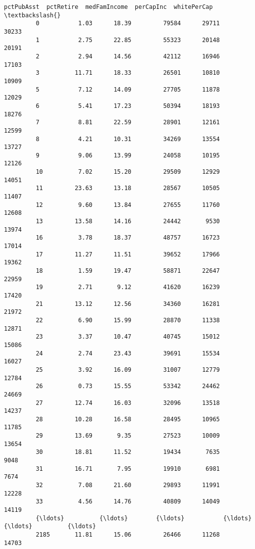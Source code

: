 \documentclass[11pt]{llncs}
\begin{document}
\begin{Verbatim}[commandchars=\\\{\}]
               pctPubAsst  pctRetire  medFamIncome  perCapInc  whitePerCap  \textbackslash{}
         0           1.03      18.39         79584      29711        30233   
         1           2.75      22.85         55323      20148        20191   
         2           2.94      14.56         42112      16946        17103   
         3          11.71      18.33         26501      10810        10909   
         5           7.12      14.09         27705      11878        12029   
         6           5.41      17.23         50394      18193        18276   
         7           8.81      22.59         28901      12161        12599   
         8           4.21      10.31         34269      13554        13727   
         9           9.06      13.99         24058      10195        12126   
         10          7.02      15.20         29509      12929        14051   
         11         23.63      13.18         28567      10505        11407   
         12          9.60      13.84         27655      11760        12608   
         13         13.58      14.16         24442       9530        13974   
         16          3.78      18.37         48757      16723        17014   
         17         11.27      11.51         39652      17966        19362   
         18          1.59      19.47         58871      22647        22959   
         19          2.71       9.12         41620      16239        17420   
         21         13.12      12.56         34360      16281        21972   
         22          6.90      15.99         28870      11338        12871   
         23          3.37      10.47         40745      15012        15086   
         24          2.74      23.43         39691      15534        16027   
         25          3.92      16.09         31007      12779        12784   
         26          0.73      15.55         53342      24462        24669   
         27         12.74      16.03         32096      13518        14237   
         28         10.28      16.58         28495      10965        11785   
         29         13.69       9.35         27523      10009        13654   
         30         18.81      11.52         19434       7635         9048   
         31         16.71       7.95         19910       6981         7674   
         32          7.08      21.60         29893      11991        12228   
         33          4.56      14.76         40809      14049        14119   
         {\ldots}          {\ldots}        {\ldots}           {\ldots}        {\ldots}          {\ldots}   
         2185       11.81      15.06         26466      11268        14703   

\end{Verbatim}
\end{document}
